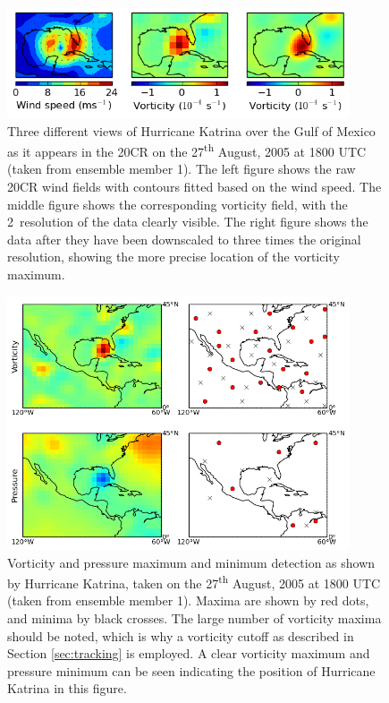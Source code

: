 \documentclass[pdftex,12pt,a4paper]{report}
\newcommand{\ts}{\textsuperscript}
\begin{document}
\begin{figure}[hb!]
    \centering
    \includegraphics[width=0.9\textwidth]{figures/katrina_data_proc}
    \caption{Three different views of Hurricane Katrina over the Gulf of Mexico as it appears in the
        20CR on the 27\ts{th} August, 2005 at 1800 UTC (taken from ensemble member 1). The left
        figure shows the raw 20CR wind fields with contours fitted based on the wind speed. The
        middle figure shows the corresponding vorticity field, with the 2\textdegree\ resolution of
        the data clearly visible. The right figure shows the data after they have been downscaled to
        three times the original resolution, showing the more precise location of the vorticity
        maximum.}
    \label{fig:katrina_data_proc}
\end{figure}

\begin{figure}[hb!]
    \centering
    \includegraphics[width=0.9\textwidth]{figures/katrina_max_mins}
    \caption{Vorticity and pressure maximum and minimum detection as shown by Hurricane Katrina,
        taken on the 27\ts{th} August, 2005 at 1800 UTC (taken from ensemble member 1). Maxima are
        shown by red dots, and minima by black crosses. The large number of vorticity maxima should
        be noted, which is why a vorticity cutoff as described in Section \ref{sec:tracking} is
        employed. A clear vorticity maximum and pressure minimum can be seen indicating the position of
        Hurricane Katrina in this figure.}
    \label{fig:katrina_max_mins}
\end{figure}
\end{document}
